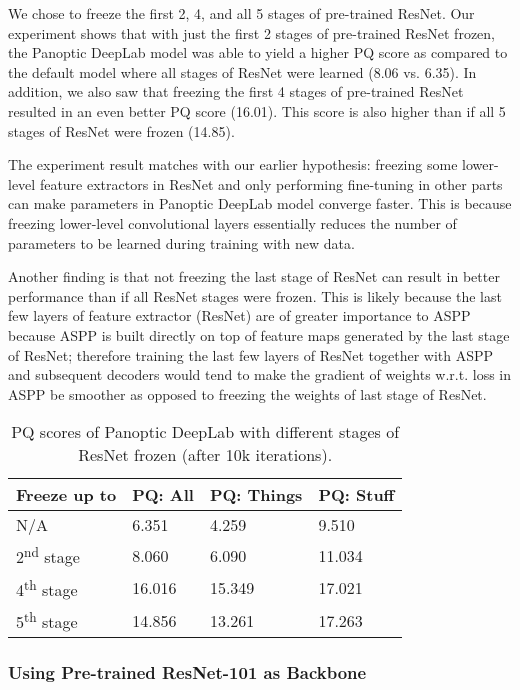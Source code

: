 \documentclass[10pt,twocolumn,letterpaper]{article}
\begin{document}
We chose to freeze the first 2, 4, and all 5 stages of pre-trained ResNet. Our experiment shows that with just the first 2 stages of pre-trained ResNet frozen, the Panoptic DeepLab model was able to yield a higher PQ score as compared to the default model where all stages of ResNet were learned (8.06 vs. 6.35). In addition, we also saw that freezing the first 4 stages of pre-trained ResNet resulted in an even better PQ score (16.01). This score is also higher than if all 5 stages of ResNet were frozen (14.85).

The experiment result matches with our earlier hypothesis: freezing some lower-level feature extractors in ResNet and only performing fine-tuning in other parts can make parameters in Panoptic DeepLab model converge faster. This is because freezing lower-level convolutional layers essentially reduces the number of parameters to be learned during training with new data.

Another finding is that not freezing the last stage of ResNet can result in better performance than if all ResNet stages were frozen. This is likely because the last few layers of feature extractor (ResNet) are of greater importance to ASPP because ASPP is built directly on top of feature maps generated by the last stage of ResNet; therefore training the last few layers of ResNet together with ASPP and subsequent decoders would tend to make the gradient of weights w.r.t. loss in ASPP be smoother as opposed to freezing the weights of last stage of ResNet.


\begin{table}[htbp]\centering
\begin{tabular}{ || m{5em} | m{4em} | m{5em}| m{4em} || } 
  \hline
  Freeze up to  & PQ: All & PQ: Things & PQ: Stuff \\ 
  \hline
  N/A & 6.351 & 4.259 & 9.510 \\ 
  \hline
  2\textsuperscript{nd} stage & 8.060 & 6.090 & 11.034 \\ 
  \hline
  4\textsuperscript{th} stage & 16.016 & 15.349 & 17.021 \\ 
  \hline
  5\textsuperscript{th} stage & 14.856 & 13.261 & 17.263 \\ 
  \hline
\end{tabular}
\caption{PQ scores of Panoptic DeepLab with different stages of ResNet frozen (after 10k iterations).}
\label{tab:deeplab_freeze_4}
\end{table}

\subsubsection{Using Pre-trained ResNet-101 as Backbone}
\end{document}
